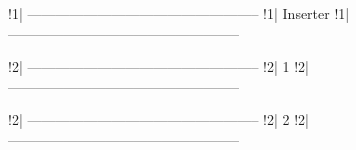 !1| --------------------------------------------------
!1| Inserter
!1| --------------------------------------------------

!2| --------------------------------------------------
!2| 1
!2| --------------------------------------------------


\usepackage{geometry}

!2| --------------------------------------------------
!2| 2
!2| --------------------------------------------------


\usepackage[left=1cm, right=1cm, top=1cm, bottom=1cm]{geometry}
